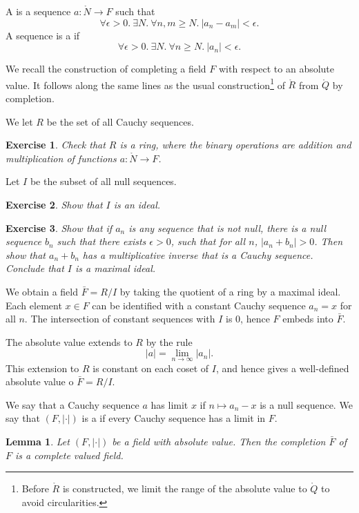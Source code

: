 \documentclass{amsart}
\newtheorem{lemma}[equation]{Lemma}
\newtheorem{exercise}{Exercise}
\def\abs#1{{|#1|}}
\def\RR{\ring{R}}
\begin{document}
A  is a sequence $a:\ring{N}\to F$ such that
\[
\forall \epsilon>0.~ \exists N.~\forall n,m \ge N.~ |a_n - a_m|<\epsilon.
\]
A sequence is a  if
\[
\forall\epsilon>0.~\exists N.~\forall n\ge N.~|a_n|<\epsilon.
\]

We recall the construction of completing a field $F$ with respect to
an absolute value.  It follows along the same lines as the usual
construction\footnote{Before $\RR$ is constructed, we limit the
  range of the absolute value to $\ring{Q}$ to avoid circularities.}
of $\RR$ from $\ring{Q}$ by completion.


We let $R$ be the set of all Cauchy sequences. 

\begin{exercise} Check that $R$ is a ring, where the binary operations
  are addition and multiplication of functions $a:\ring{N}\to F$.
\end{exercise}

Let $I$ be the subset
of all null sequences.  

\begin{exercise} Show that $I$ is an ideal.
\end{exercise}

\begin{exercise} 
Show that if $a_n$ is any sequence that is not null, there is a null sequence $b_n$
such that there exists $\epsilon>0$, such that for all $n$, $\abs{a_n+b_n}>0$.
Then show that $a_n+b_n$ has a multiplicative inverse that is a Cauchy sequence.
Conclude that $I$ is a maximal ideal.
\end{exercise}

We obtain a field $\bar F = R/I$ by taking the quotient of a ring by a maximal ideal.
Each element $x\in F$ can be identified with a constant Cauchy sequence $a_n=x$ for all 
$n$.  The intersection of constant sequences with $I$ is $0$, hence $F$ embeds into $\bar F$.

The absolute value extends to $R$ by the rule
\[
\abs{a} = \lim_{n\to\infty} |a_n|.
\]
This extension to $R$ is constant on each coset of $I$, and hence gives a well-defined
absolute value o $\bar F = R/I$.

We say that a Cauchy sequence $a$ has limit $x$ if $n\mapsto a_n-x$ is a null sequence.
We say that $(F,\abs{\cdot})$ is a  if every Cauchy
sequence has a limit in $F$.

\begin{lemma}  Let $(F,\abs{\cdot})$ be a field with absolute value.
Then the completion $\bar F$ of $F$ is a complete valued field.
\end{lemma}
\end{document}
